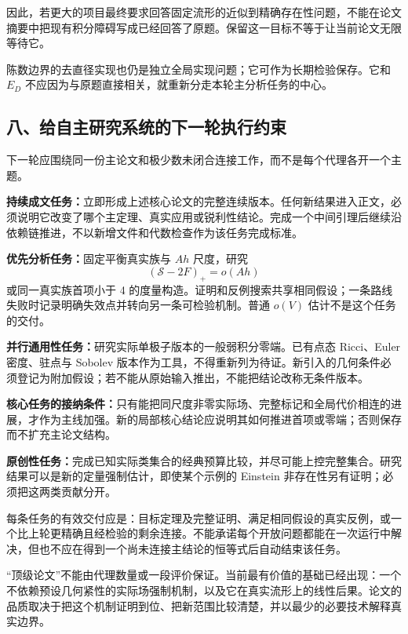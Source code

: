 \documentclass[
  10pt,
]{article}
\begin{document}
因此，若更大的项目最终要求回答固定流形的近似到精确存在性问题，不能在论文摘要中把现有积分障碍写成已经回答了原题。保留这一目标不等于让当前论文无限等待它。

陈数边界的去直径实现也仍是独立全局实现问题；它可作为长期检验保存。它和
\(E_D\) 不应因为与原题直接相关，就重新分走本轮主分析任务的中心。

\hypertarget{ux516bux7ed9ux81eaux4e3bux7814ux7a76ux7cfbux7edfux7684ux4e0bux4e00ux8f6eux6267ux884cux7ea6ux675f}{%
\subsection{八、给自主研究系统的下一轮执行约束}\label{ux516bux7ed9ux81eaux4e3bux7814ux7a76ux7cfbux7edfux7684ux4e0bux4e00ux8f6eux6267ux884cux7ea6ux675f}}

下一轮应围绕同一份主论文和极少数未闭合连接工作，而不是每个代理各开一个主题。

\textbf{持续成文任务：}立即形成上述核心论文的完整连续版本。任何新结果进入正文，必须说明它改变了哪个主定理、真实应用或锐利性结论。完成一个中间引理后继续沿依赖链推进，不以新增文件和代数检查作为该任务完成标准。

\textbf{优先分析任务：}固定平衡真实族与 \(Ah\) 尺度，研究 \[
(\mathscr S-2F)_+=o(Ah)
\] 或同一真实族首项小于 4
的度量构造。证明和反例搜索共享相同假设；一条路线失败时记录明确失效点并转向另一条可检验机制。普通
\(o(V)\) 估计不是这个任务的交付。

\textbf{并行通用性任务：}研究实际单极子版本的一般弱积分零端。已有点态
Ricci、Euler 密度、驻点与 Sobolev
版本作为工具，不得重新列为待证。新引入的几何条件必须登记为附加假设；若不能从原始输入推出，不能把结论改称无条件版本。

\textbf{核心任务的接纳条件：}只有能把同尺度非零实际场、完整标记和全局代价相连的进展，才作为主线加强。新的局部核心结论应说明其如何推进首项或零端；否则保存而不扩充主论文结构。

\textbf{原创性任务：}完成已知实际类集合的经典预算比较，并尽可能上控完整集合。研究结果可以是新的定量强制估计，即使某个示例的
Einstein 非存在性另有证明；必须把这两类贡献分开。

每条任务的有效交付应是：目标定理及完整证明、满足相同假设的真实反例，或一个比上轮更精确且经检验的剩余连接。不能承诺每个开放问题都能在一次运行中解决，但也不应在得到一个尚未连接主结论的恒等式后自动结束该任务。

``顶级论文''不能由代理数量或一段评价保证。当前最有价值的基础已经出现：一个不依赖预设几何紧性的实际场强制机制，以及它在真实流形上的线性后果。论文的品质取决于把这个机制证明到位、把新范围比较清楚，并以最少的必要技术解释真实边界。
\end{document}
